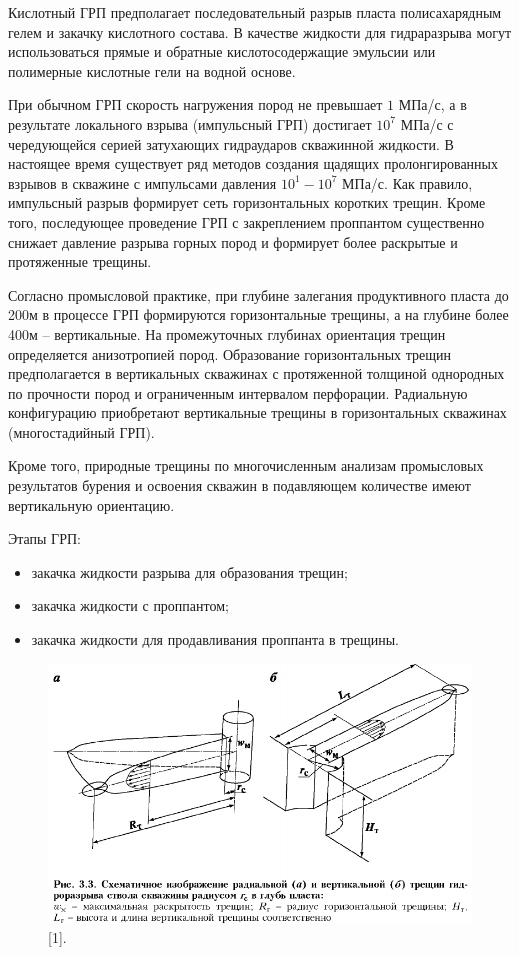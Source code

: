 Кислотный ГРП предполагает последовательный разрыв пласта полисахарядным гелем и закачку кислотного состава. В качестве жидкости для гидраразрыва могут использоваться прямые и обратные кислотосодержащие эмульсии или полимерные кислотные гели на водной основе.

При обычном ГРП скорость нагружения пород не превышает $1$ МПа/с, а в результате локального взрыва (импульсный ГРП) достигает $10^7$ МПа/с с чередующейся серией затухающих гидраударов скважинной жидкости. В настоящее время существует ряд методов создания щадящих пролонгированных взрывов в скважине с импульсами давления $10^1-10^7$ МПа/с. Как правило, импульсный разрыв формирует сеть горизонтальных коротких трещин. Кроме того, последующее
проведение ГРП с закреплением проппантом существенно снижает давление разрыва горных пород и формирует более раскрытые и протяженные трещины.

Согласно промысловой практике, при глубине залегания продуктивного пласта до 200м в процессе ГРП формируются горизонтальные трещины, а на глубине более 400м -- вертикальные. На промежуточных глубинах ориентация трещин определяется анизотропией пород. Образование горизонтальных трещин предполагается в вертикальных скважинах с протяженной толщиной однородных по прочности пород и ограниченным интервалом перфорации. Радиальную конфигурацию приобретают вертикальные трещины в горизонтальных скважинах (многостадийный ГРП).

Кроме того, природные трещины по многочисленным анализам промысловых результатов бурения и освоения скважин в подавляющем количестве имеют вертикальную ориентацию.

Этапы ГРП:
\begin{itemize}
\item
закачка жидкости разрыва для образования трещин;
\item
закачка жидкости с проппантом;
\item
закачка жидкости для продавливания проппанта в трещины.
\end{itemize}

\begin{figure}[h!]
	\includegraphics[height=0.4\textheight]{pictures/crack_g_v.png}
	\caption{ [1].
	}
	\label{fig:introduction1}
\end{figure}

